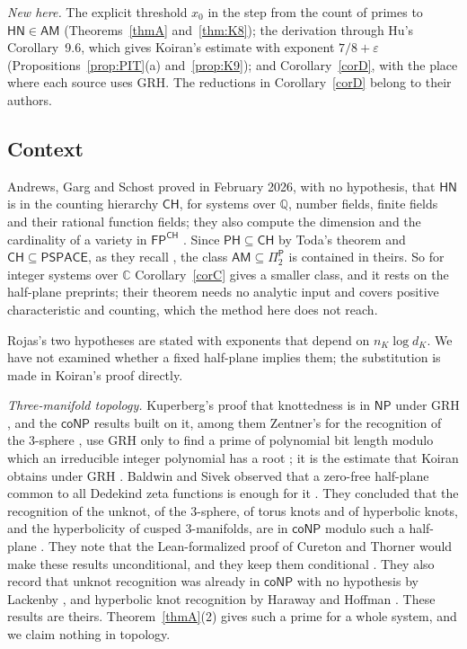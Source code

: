 \documentclass[11pt]{amsart}
\theoremstyle{definition}
\theoremstyle{remark}
\newcommand{\Q}{\mathbb Q}
\newcommand{\C}{\mathbb C}
\newcommand{\cl}[1]{\mathsf{#1}}
\newcommand{\HN}{\cl{HN}}
\newcommand{\AM}{\cl{AM}}
\newcommand{\Pitwo}{\Pi_2^{\cl P}}
\begin{document}
\emph{New here.} The explicit threshold $x_0$ in the step from the count of primes to $\HN\in\AM$ (Theorems~\ref{thmA} and~\ref{thm:K8}); the derivation through Hu's Corollary~9.6, which gives Koiran's estimate with exponent $7/8+\varepsilon$ (Propositions~\ref{prop:PIT}(a) and~\ref{prop:K9}); and Corollary~\ref{corD}, with the place where each source uses GRH. The reductions in Corollary~\ref{corD} belong to their authors.

\subsection{Context}\label{sec:context}
Andrews, Garg and Schost proved in February 2026, with no hypothesis, that $\HN$ is in the counting hierarchy $\cl{CH}$, for systems over $\Q$, number fields, finite fields and their rational function fields; they also compute the dimension and the cardinality of a variety in $\cl{FP}^{\cl{CH}}$ \cite[Theorems~1.1, 1.3, 1.4]{AGS}. Since $\cl{PH}\subseteq\cl{CH}$ by Toda's theorem and $\cl{CH}\subseteq\cl{PSPACE}$, as they recall \cite[\S1.2]{AGS}, the class $\AM\subseteq\Pitwo$ is contained in theirs. So for integer systems over $\C$ Corollary~\ref{corC} gives a smaller class, and it rests on the half-plane preprints; their theorem needs no analytic input and covers positive characteristic and counting, which the method here does not reach.

Rojas's two hypotheses \cite[p.~6]{Roj} are stated with exponents that depend on $n_K\log d_K$. We have not examined whether a fixed half-plane implies them; the substitution is made in Koiran's proof directly.

\emph{Three-manifold topology.} Kuperberg's proof that knottedness is in $\cl{NP}$ under GRH \cite[Theorem~1.1]{Kup}, and the $\cl{coNP}$ results built on it, among them Zentner's for the recognition of the $3$-sphere \cite[Theorem~11.2]{Zen}, use GRH only to find a prime of polynomial bit length modulo which an irreducible integer polynomial has a root \cite[Theorem~3.2]{Kup}; it is the estimate that Koiran obtains under GRH \cite[p.~2]{BS}. Baldwin and Sivek observed that a zero-free half-plane common to all Dedekind zeta functions is enough for it \cite[Theorem~2.1]{BS}. They concluded that the recognition of the unknot, of the $3$-sphere, of torus knots and of hyperbolic knots, and the hyperbolicity of cusped $3$-manifolds, are in $\cl{coNP}$ modulo such a half-plane \cite[Theorems~1.1 and~1.3]{BS}. They note that the Lean-formalized proof of Cureton and Thorner would make these results unconditional, and they keep them conditional \cite[pp.~2--3]{BS}. They also record that unknot recognition was already in $\cl{coNP}$ with no hypothesis by Lackenby \cite{Lac}, and hyperbolic knot recognition by Haraway and Hoffman \cite[Remark~1.4]{BS}. These results are theirs. Theorem~\ref{thmA}(2) gives such a prime for a whole system, and we claim nothing in topology.
\end{document}
